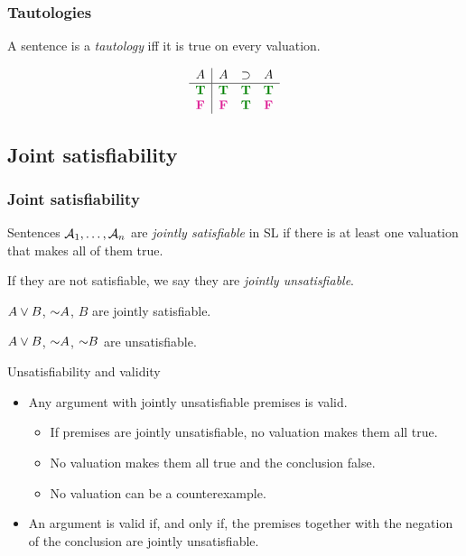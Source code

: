 \begin{frame}
\frametitle{Tautologies}

\begin{definition}
A sentence  is a \emph{tautology} iff it is true on every
valuation.
\end{definition}

\[\begin{array}{c|ccc}
A & A & \eif & A \\
\hline
\True & \True & \True & \True\\
\False & \False & \True & \False
\end{array}
\]
\end{frame}

\subsection{Joint satisfiability}

\begin{frame}
\frametitle{Joint satisfiability}

\begin{definition}
Sentences $\mathcal{A}_1, \dots, \mathcal{A}_n$ are \emph{jointly
satisfiable} in SL if there is at least one valuation that makes all
of them true.

If they are not satisfiable, we say they are \emph{jointly unsatisfiable}.
\end{definition}

$A \vee B$, $\enot A$, $B$ are jointly satisfiable.

$A \vee B$, $\enot A$, $\enot B$ are  unsatisfiable.
\end{frame}

\begin{frame}{Unsatisfiability and validity}
  \begin{itemize}[<+->]
    \item Any argument with jointly unsatisfiable premises is valid.
    \begin{itemize}[<+->]
      \item If premises are jointly unsatisfiable, no valuation makes
      them all true.
      \item No valuation makes them all true and the conclusion false.
      \item No valuation can be a counterexample.
    \end{itemize}
    \item An argument is valid if, and only if, the premises together
    with the negation of the conclusion are jointly unsatisfiable.
  \end{itemize}
  
\end{frame}

